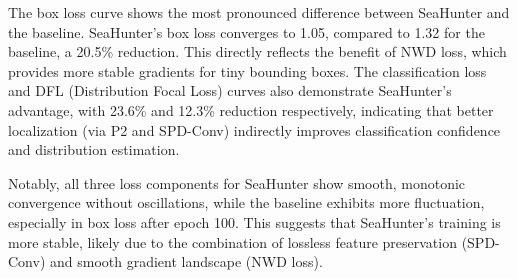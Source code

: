 The box loss curve shows the most pronounced difference between SeaHunter and the baseline. SeaHunter's box loss converges to 1.05, compared to 1.32 for the baseline, a 20.5\% reduction. This directly reflects the benefit of NWD loss, which provides more stable gradients for tiny bounding boxes. The classification loss and DFL (Distribution Focal Loss) curves also demonstrate SeaHunter's advantage, with 23.6\% and 12.3\% reduction respectively, indicating that better localization (via P2 and SPD-Conv) indirectly improves classification confidence and distribution estimation.

Notably, all three loss components for SeaHunter show smooth, monotonic convergence without oscillations, while the baseline exhibits more fluctuation, especially in box loss after epoch 100. This suggests that SeaHunter's training is more stable, likely due to the combination of lossless feature preservation (SPD-Conv) and smooth gradient landscape (NWD loss).


